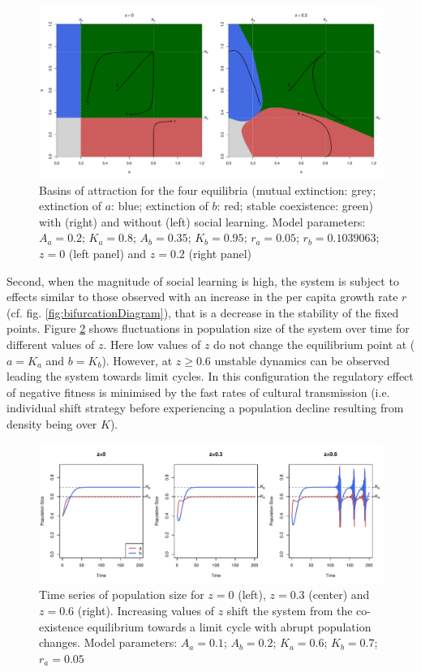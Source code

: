 \documentclass[review,authoryear]{elsarticle}
\begin{document}
\begin{figure}
  \centering
      \includegraphics[width=\columnwidth]{./figures/figure3.pdf}
  \caption{Basins of attraction for the four equilibria (mutual extinction: grey; extinction of $a$: blue; extinction of $b$: red; stable coexistence: green) with (right) and without (left) social learning. Model parameters: $A_a=0.2$; $K_a=0.8$; $A_b=0.35$; $K_b=0.95$; $r_a=0.05$; $r_b=0.1039063$; $z=0$ (left panel) and $z=0.2$ (right panel) } 
    \label{fig:TransmissionBasin}
\end{figure}


Second, when the magnitude of social learning is high, the system is subject to effects similar to those observed with an increase in the per capita growth rate $r$ (cf. fig. \ref{fig:bifurcationDiagram}), that is a decrease in the stability of the fixed points. Figure \ref{fig:TSsocialLearning} shows fluctuations in population size of the system over time for different values of $z$. Here low values of $z$ do not change the equilibrium point at ($a=K_a$ and $b=K_b$). However, at $z \geq 0.6$ unstable dynamics can be observed leading the system towards limit cycles. In this configuration the regulatory effect of negative fitness is minimised by the fast rates of cultural transmission (i.e. individual shift strategy before experiencing a population decline resulting from density being over $K$). 

\begin{figure}
  \centering
      \includegraphics[width=1\textwidth]{./figures/figure4b.pdf}
  \caption{Time series of population size for $z=0$ (left), $z=0.3$ (center) and $z=0.6$ (right). Increasing values of $z$ shift the system from the co-existence equilibrium towards a limit cycle with abrupt population changes. Model parameters: $A_a=0.1$; $A_b=0.2$; $K_a=0.6$; $K_b=0.7$; $r_a=0.05$}
    \label{fig:TSsocialLearning}
\end{figure}
\end{document}
